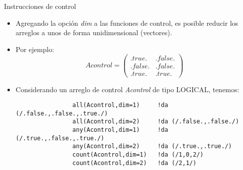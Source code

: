 \begin{frame}[fragile]{Instrucciones de control}
    \begin{itemize}[<+(0)->]
        \item Agregando la opción \emph{dim} a las funciones de control, es posible reducir los arreglos a unos de forma unidimensional (vectores).
        \item [] Por ejemplo: 
            $$
                Acontrol = \left( \begin{array}{cc}
                    .true.  & .false.  \\
                    .false. & .false. \\
                    .true.  & .true. \end{array} \right)
            $$
        \item Considerando un arreglo de control \emph{Acontrol} de tipo LOGICAL, tenemos:
         \vspace{0.12cm}
            \begin{verbatim}
                all(Acontrol,dim=1)     !da (/.false.,.false.,.true./)
                all(Acontrol,dim=2)     !da (/.false.,.false./)
                any(Acontrol,dim=1)     !da (/.true.,.false.,.true./)
                any(Acontrol,dim=2)     !da (/.true.,.true./)
                count(Acontrol,dim=1)   !da (/1,0,2/)
                count(Acontrol,dim=2)   !da (/2,1/)
            \end{verbatim}                         
    \end{itemize}
\end{frame}


